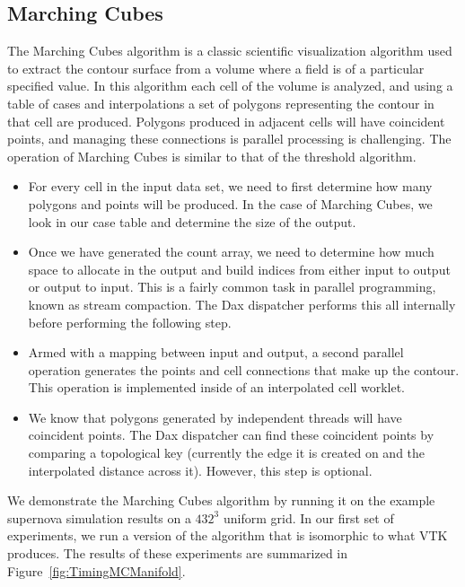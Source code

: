 \subsection{Marching Cubes}

The Marching Cubes algorithm is a classic scientific
visualization algorithm used to extract the contour surface from a volume
where a field is of a particular specified value. In this algorithm each
cell of the volume is analyzed, and using a table of cases and
interpolations a set of polygons representing the contour in that cell are
produced. Polygons produced in adjacent cells will have coincident points,
and managing these connections is parallel processing is challenging. The
operation of Marching Cubes is similar to that of the threshold algorithm.

\begin{itemize}
\item For every cell in the input data set, we need to first determine how
  many polygons and points will be produced. In the case of Marching Cubes,
  we look in our case table and determine the size of the output.
\item Once we have generated the count array, we need to determine how much
  space to allocate in the output and build indices from either input to
  output or output to input. This is a fairly common task in parallel
  programming, known as stream compaction. The Dax dispatcher performs this
  all internally before performing the following step.
\item Armed with a mapping between input and output, a second parallel
  operation generates the points and cell connections that make up the
  contour. This operation is implemented inside of an interpolated cell
  worklet.
\item We know that polygons generated by independent threads will have
  coincident points. The Dax dispatcher can find these coincident points by
  comparing a topological key (currently the edge it is created on and the
  interpolated distance across it). However, this step is optional.
\end{itemize}

We demonstrate the Marching Cubes algorithm by running it on the example
supernova simulation results on a $432^3$ uniform grid. In our first set of
experiments, we run a version of the algorithm that is isomorphic to what
VTK produces. The results of these experiments are summarized in
Figure~\ref{fig:TimingMCManifold}.

